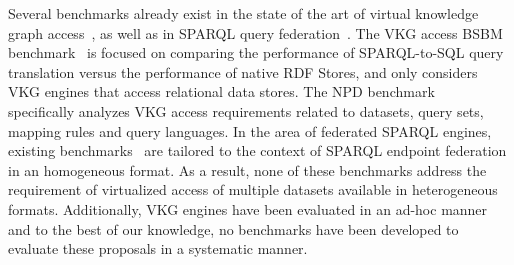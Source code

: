 Several benchmarks already exist in the state of the art of virtual knowledge graph access~\cite{bizer2009berlin,lanti2015npd}, as well as in SPARQL query federation~\cite{schmidt2011fedbench,hasnain2017biofed,montoya2012benchmarking}. The VKG access BSBM benchmark~\cite{bizer2009berlin} is focused on comparing the performance of SPARQL-to-SQL query translation versus the performance of native RDF Stores, and only considers VKG engines that access relational data stores. The NPD benchmark~\cite{lanti2015npd} specifically analyzes VKG access requirements related to datasets, query sets, mapping rules and query languages. In the area of federated SPARQL engines, existing benchmarks~\cite{schmidt2011fedbench,hasnain2017biofed,montoya2012benchmarking} are tailored to the context of SPARQL endpoint federation in an homogeneous format. As a result, none of these benchmarks address the requirement of virtualized access of multiple datasets available in heterogeneous formats. Additionally, VKG engines have been evaluated in an ad-hoc manner~\cite{endris2019ontario,mami2019querying} and to the best of our knowledge, no benchmarks have been developed to evaluate these proposals in a systematic manner. 








